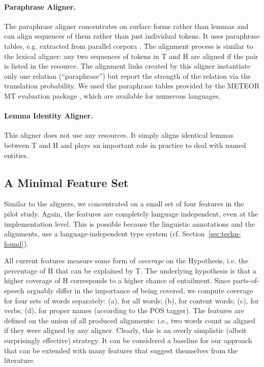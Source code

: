 \documentclass[11pt,letterpaper]{article}
\begin{document}
\paragraph{Paraphrase Aligner.} The paraphrase aligner concentrates on
surface forms rather than lemmas and can align sequences of them
rather than just individual tokens. It uses paraphrase tables, e.g.
extracted from parallel corpora
\cite{bannard05:_parap_bilin_paral_corpor}. The alignment process is
similar to the lexical aligner: any two sequences of tokens in T and H 
are aligned if the pair is listed in the resource.  The alignment
links created by this aligner instantiate only one relation
(``paraphrase'') but report the strength of the relation via the
translation probability. We used the paraphrase tables provided by the
METEOR MT evaluation package \cite{denkowski-lavie:2014:W14-33}, which
are available for numerous languages. 

\paragraph{Lemma Identity Aligner.} This aligner does not use any
resources. It simply aligns identical lemmas between T and H and plays
an important role in practice to deal with named entities.

\subsection{A Minimal Feature Set} 

Similar to the aligners, we concentrated on a small set of four
features in the pilot study. Again, the features are completely
language independent, even at the implementation level. This is
possible because the linguistic annotations and the alignments, use a
language-independent type system (cf. Section~\ref{sec:techn-found}).

All current features measure some form of \textit{coverage} on the
Hypothesis, i.e. the percentage of H that can be explained by T. The
underlying hypothesis is that a higher coverage of H corresponds to a
higher chance of entailment. Since parts-of-speech arguably differ in
the importance of being covered, we compute coverage for four sets of
words separately: (a), for all words; (b), for content words; (c), for
verbs; (d), for proper names (according to the POS tagger). The
features are defined on the union of all produced alignments: i.e.,
two words count as aligned if they were aligned by any aligner. 
Clearly, this is an overly simplistic (albeit surprisingly effective)
strategy. It can be considered a baseline for our approach that can be
extended with many features that suggest themselves from the
literature. 
\end{document}
